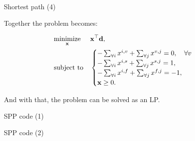 \documentclass{beamer}
\begin{document}
\begin{frame}{Shortest path (4)}
	\begin{flushleft}
		
		
		Together the problem becomes:
		
		\begin{equation} \label{LP}
			\begin{aligned}
				& \underset{\mathbf{x}}{\text{minimize}}
				& & \mathbf{x}^\top \mathbf{d}, \\
				& \text{subject to}
				& & \begin{cases} 
					-\sum_{\forall i} x^{i,v} + \sum_{\forall j} x^{v,j} = 0, \ \ \ \forall v \\ 
					-\sum_{\forall i} x^{i,s} + \sum_{\forall j} x^{s,j} = 1,  \\
					-\sum_{\forall i} x^{i,f} + \sum_{\forall j} x^{f,j} = -1,\\
					\mathbf{x} \geq 0.
				\end{cases}
			\end{aligned}
		\end{equation}
	
		And with that, the problem can be solved as an LP.
		
	\end{flushleft}
\end{frame}



\begin{frame}{SPP code (1)}
	\begin{flushleft}
		
		
		
	\end{flushleft}
\end{frame}



\begin{frame}{SPP code (2)}
	\begin{flushleft}
		
		
		
	\end{flushleft}
\end{frame}


\begin{frame}
	\begin{flushleft}
		
		
	\end{flushleft}
\end{frame}
\end{document}
